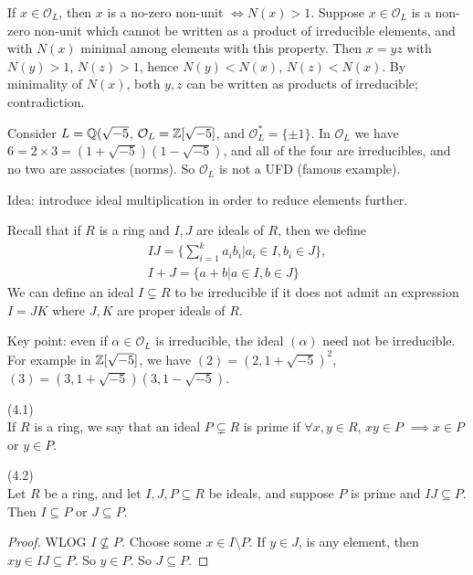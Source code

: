 \documentclass[a4paper]{article}
\begin{document}
If $x \in \mathcal{O}_L$, then $x$ is a no-zero non-unit $\iff N(x)>1$. Suppose $x \in \mathcal{O}_L$ is a non-zero non-unit which cannot be written as a product of irreducible elements, and with $N(x)$ minimal among elements with this property. Then $x=yz$ with $N(y) >1$, $N(z)>1$, hence $N(y)<N(x)$, $N(z)<N(x)$. By minimality of $N(x)$, both $y,z$ can be written as products of irreducible; contradiction.

\begin{eg}
Consider $L=\mathbb{Q}(\sqrt{-5}$, $\mathcal{O}_L = \mathbb{Z}[\sqrt{-5}]$, and $\mathcal{O}_L^* = \{\pm 1\}$. In $\mathcal{O}_L$ we have $6 = 2 \times 3 = (1+\sqrt{-5})(1-\sqrt{-5})$, and all of the four are irreducibles, and no two are associates (norms). So $\mathcal{O}_L$ is not a UFD (famous example).
\end{eg}

Idea: introduce ideal multiplication in order to reduce elements further.

Recall that if $R$ is a ring and $I,J$ are ideals of $R$, then we define
\begin{equation*}
\begin{aligned}
IJ = \{\sum_{i=1}^k a_ib_i | a_i \in I, b_i \in J\},\\
I+J = \{a+b|a\in I, b \in J\}
\end{aligned}
\end{equation*}
We can define an ideal $I \subsetneq R$ to be irreducible if it does not admit an expression $I=JK$ where $J,K$ are proper ideals of $R$.

Key point: even if $\alpha \in \mathcal{O}_L$ is irreducible, the ideal $(\alpha)$ need not be irreducible. For example in $\mathbb{Z}[\sqrt{-5}]$, we have $(2) = (2,1+\sqrt{-5})^2$, $(3) = (3,1+\sqrt{-5})(3,1-\sqrt{-5})$.

\begin{defi} (4.1)\\
If $R$ is a ring, we say that an ideal $P \subsetneq R$ is prime if $\forall x,y \in R$, $xy \in P$ $\implies x \in P$ or $y \in P$.
\end{defi}

\begin{lemma} (4.2)\\
Let $R$ be a ring, and let $I,J,P \subseteq R$ be ideals, and suppose $P$ is prime and $IJ \subseteq P$. Then $I \subseteq P$ or $J \subseteq P$.
\begin{proof}
WLOG $I \not\subseteq P$. Choose some $x \in I \setminus P$. If $y \in J$, is any element, then $xy \in IJ \subseteq P$. So $y \in P$. So $J \subseteq P$.
\end{proof}
\end{lemma}
\end{document}
